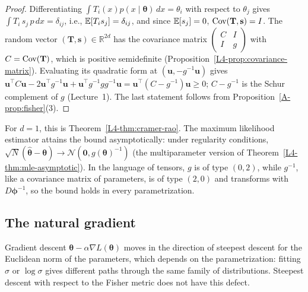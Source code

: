 \begin{proof}
    Differentiating $\int T_i(x)p(x \mid \boldsymbol{\theta})\, dx = \theta_i$ with respect to $\theta_j$ gives $\int T_i\,s_j\,p\, dx = \delta_{ij}$, i.e., $\mathbb{E}[T_is_j] = \delta_{ij}$, and since $\mathbb{E}[s_j] = 0$, $\operatorname{Cov}(\mathbf{T}, \mathbf{s}) = I$. The random vector $(\mathbf{T}, \mathbf{s}) \in \mathbb{R}^{2d}$ has the covariance matrix $\begin{pmatrix} C & I \\ I & g \end{pmatrix}$ with $C = \operatorname{Cov}(\mathbf{T})$, which is positive semidefinite (Proposition~\ref{L4-prop:covariance-matrix}). Evaluating its quadratic form at $(\mathbf{u}, -g^{-1}\mathbf{u})$ gives $\mathbf{u}^\top C\mathbf{u} - 2\mathbf{u}^\top g^{-1}\mathbf{u} + \mathbf{u}^\top g^{-1}gg^{-1}\mathbf{u} = \mathbf{u}^\top(C - g^{-1})\mathbf{u} \geq 0$; $C - g^{-1}$ is the Schur complement of $g$ (Lecture~1). The last statement follows from Proposition~\ref{A-prop:fisher}(3).
\end{proof}

For $d = 1$, this is Theorem~\ref{L4-thm:cramer-rao}. The maximum likelihood estimator attains the bound asymptotically: under regularity conditions, $\sqrt{N}(\hat{\boldsymbol{\theta}} - \boldsymbol{\theta}) \to \mathcal{N}(\mathbf{0}, g(\boldsymbol{\theta})^{-1})$ (the multiparameter version of Theorem~\ref{L4-thm:mle-asymptotic}). In the language of tensors, $g$ is of type $(0, 2)$, while $g^{-1}$, like a covariance matrix of parameters, is of type $(2, 0)$ and transforms with $D\boldsymbol{\phi}^{-1}$, so the bound holds in every parametrization.

\subsection{The natural gradient}

Gradient descent $\boldsymbol{\theta} - \alpha\nabla L(\boldsymbol{\theta})$ moves in the direction of steepest descent for the Euclidean norm of the parameters, which depends on the parametrization: fitting $\sigma$ or $\log\sigma$ gives different paths through the same family of distributions. Steepest descent with respect to the Fisher metric does not have this defect.

